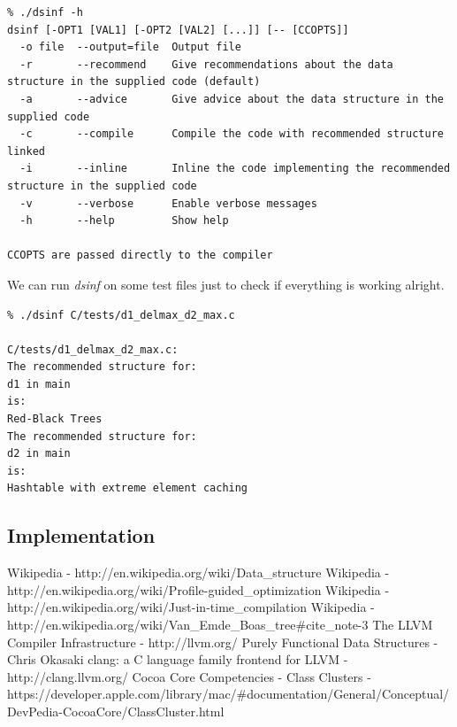 \documentclass[a4paper,11pt]{article}
\begin{document}
\begin{appendices}
	\begingroup
    \fontsize{8pt}{12pt}\selectfont
    \begin{verbatim}  
% ./dsinf -h
dsinf [-OPT1 [VAL1] [-OPT2 [VAL2] [...]] [-- [CCOPTS]]
  -o file  --output=file  Output file
  -r       --recommend    Give recommendations about the data structure in the supplied code (default)
  -a       --advice       Give advice about the data structure in the supplied code
  -c       --compile      Compile the code with recommended structure linked
  -i       --inline       Inline the code implementing the recommended structure in the supplied code
  -v       --verbose      Enable verbose messages
  -h       --help         Show help

CCOPTS are passed directly to the compiler
    \end{verbatim}  
\endgroup
	
	We can run \emph{dsinf} on some test files just to check if everything is working alright.
	\begin{verbatim}
% ./dsinf C/tests/d1_delmax_d2_max.c

C/tests/d1_delmax_d2_max.c:
The recommended structure for:
d1 in main
is:
Red-Black Trees
The recommended structure for:
d2 in main
is:
Hashtable with extreme element caching
	\end{verbatim}
	
	\subsection{Implementation}
\end{appendices}

\newpage
\begin{thebibliography}{9}
	 Wikipedia - http://en.wikipedia.org/wiki/Data\_structure
     Wikipedia - http://en.wikipedia.org/wiki/Profile-guided\_optimization
     Wikipedia - http://en.wikipedia.org/wiki/Just-in-time\_compilation
     Wikipedia - http://en.wikipedia.org/wiki/Van\_Emde\_Boas\_tree\#cite\_note-3
	 The LLVM Compiler Infrastructure - http://llvm.org/
	 Purely Functional Data Structures - Chris Okasaki
	 clang: a C language family frontend for LLVM - http://clang.llvm.org/
	 Cocoa Core Competencies - Class Clusters - \\
		https://developer.apple.com/library/mac/\#documentation/General/Conceptual/DevPedia-CocoaCore/ClassCluster.html
\end{thebibliography}
\end{document}
